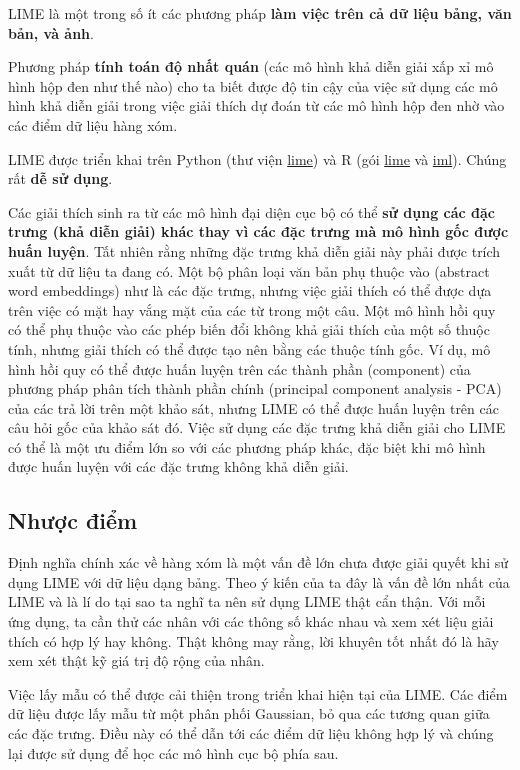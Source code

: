 LIME là một trong số ít các phương pháp \textbf{làm việc trên cả dữ liệu bảng, văn bản, và ảnh}.

Phương pháp \textbf{tính toán độ nhất quán} (các mô hình khả diễn giải xấp xỉ mô hình hộp đen như thế nào) cho ta biết được độ tin cậy của việc sử dụng các mô hình khả diễn giải trong việc giải thích dự đoán từ các mô hình hộp đen nhờ vào các điểm dữ liệu hàng xóm.

LIME được triển khai trên Python (thư viện \href{https://github.com/marcotcr/lime}{lime}) và R (gói \href{https://cran.r-project.org/web/packages/lime/index.html}{lime} và \href{https://cran.r-project.org/web/packages/iml/index.html}{iml}). Chúng rất \textbf{dễ sử dụng}.

Các giải thích sinh ra từ các mô hình đại diện cục bộ có thể \textbf{sử dụng các đặc trưng (khả diễn giải) khác thay vì các đặc trưng mà mô hình gốc được huấn luyện}. Tất nhiên rằng những đặc trưng khả diễn giải này phải được trích xuất từ dữ liệu ta đang có. Một bộ phân loại văn bản phụ thuộc vào (abstract word embeddings) như là các đặc trưng, nhưng việc giải thích có thể được dựa trên việc có mặt hay vắng mặt của các từ trong một câu. Một mô hình hồi quy có thể phụ thuộc vào các phép biến đổi không khả giải thích của một số thuộc tính, nhưng giải thích có thể được tạo nên bằng các thuộc tính gốc. Ví dụ, mô hình hồi quy có thể được huấn luyện trên các thành phần (component) của phương pháp phân tích thành phần chính (principal component analysis - PCA) của các trả lời trên một khảo sát, nhưng LIME có thể được huấn luyện trên các câu hỏi gốc của khảo sát đó. Việc sử dụng các đặc trưng khả diễn giải cho LIME có thể là một ưu điểm lớn so với các phương pháp khác, đặc biệt khi mô hình được huấn luyện với các đặc trưng không khả diễn giải.

\subsection{Nhược điểm}

Định nghĩa chính xác về hàng xóm là một vấn đề lớn chưa được giải quyết khi sử dụng LIME với dữ liệu dạng bảng. Theo ý kiến của ta đây là vấn đề lớn nhất của LIME và là lí do tại sao ta nghĩ ta nên sử dụng LIME thật cẩn thận. Với mỗi ứng dụng, ta cần thử các nhân với các thông số khác nhau và xem xét liệu giải thích có hợp lý hay không. Thật không may rằng, lời khuyên tốt nhất đó là hãy xem xét thật kỹ giá trị độ rộng của nhân.

Việc lấy mẫu có thể được cải thiện trong triển khai hiện tại của LIME. Các điểm dữ liệu được lấy mẫu từ một phân phối Gaussian, bỏ qua các tương quan giữa các đặc trưng. Điều này có thể dẫn tới các điểm dữ liệu không hợp lý và chúng lại được sử dụng để học các mô hình cục bộ phía sau.

